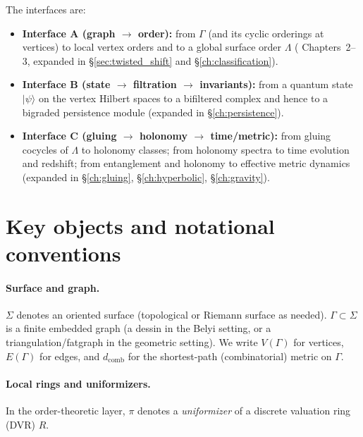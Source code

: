 \documentclass[11pt,oneside]{amsbook}
\numberwithin{equation}{section}
\theoremstyle{plain}
\theoremstyle{definition}
\theoremstyle{remark}
\begin{document}
The interfaces are:
\begin{itemize}
\item \textbf{Interface A (graph $\to$ order):} from $\Gamma$ (and its cyclic orderings at vertices) to local vertex orders and to a global surface order $\Lambda$ ( Chapters~2--3, expanded in \S\ref{sec:twisted_shift} and \S\ref{ch:classification}).
\item \textbf{Interface B (state $\to$ filtration $\to$ invariants):} from a quantum state $|\psi\rangle$ on the vertex Hilbert spaces to a bifiltered complex and hence to a bigraded persistence module (expanded in \S\ref{ch:persistence}).
\item \textbf{Interface C (gluing $\to$ holonomy $\to$ time/metric):} from gluing cocycles of $\Lambda$ to holonomy classes; from holonomy spectra to time evolution and redshift; from entanglement and holonomy to effective metric dynamics (expanded in \S\ref{ch:gluing}, \S\ref{ch:hyperbolic}, \S\ref{ch:gravity}).
\end{itemize}

\section*{Key objects and notational conventions}

\paragraph{Surface and graph.}
$\Sigma$ denotes an oriented surface (topological or Riemann surface as needed).
$\Gamma\subset\Sigma$ is a finite embedded graph (a dessin in the Belyi setting, or a triangulation/fatgraph in the geometric setting).
We write $V(\Gamma)$ for vertices, $E(\Gamma)$ for edges, and $d_{\mathrm{comb}}$ for the shortest-path (combinatorial) metric on $\Gamma$.

\paragraph{Local rings and uniformizers.}
In the order-theoretic layer, $\pi$ denotes a \emph{uniformizer} of a discrete valuation ring (DVR) $R$. 
\end{document}
